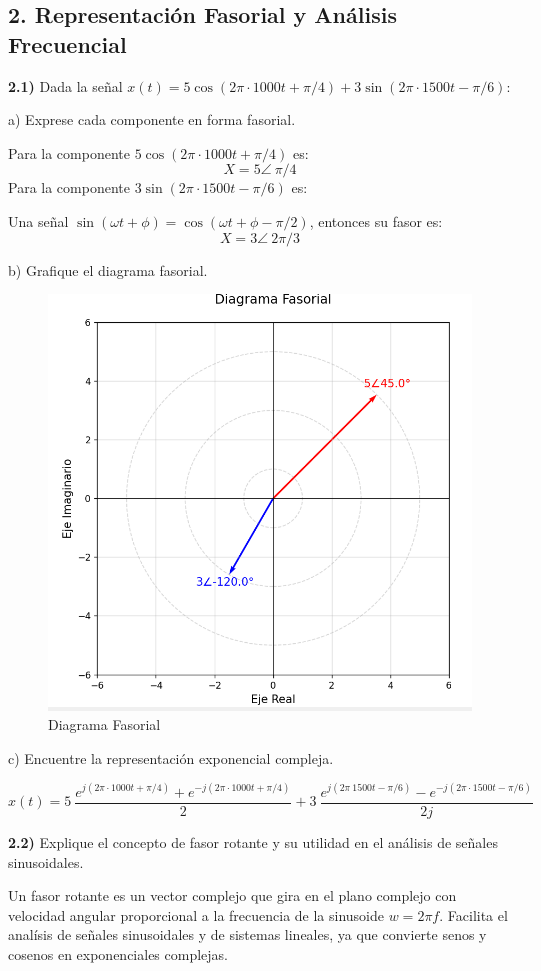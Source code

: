 \subsection*{2. Representación Fasorial y Análisis Frecuencial}

\noindent \textbf{2.1)} Dada la señal \( x(t) = 5\cos(2\pi \cdot 1000t + \pi/4) + 3\sin(2\pi \cdot 1500t - \pi/6) \):\par
\bigskip
    \noindent a) Exprese cada componente en forma fasorial.\par
    \bigskip
    
    Para la componente \(5\cos(2\pi \cdot 1000t + \pi/4) \) es:
    \[
    X = 5 \angle \ \pi/4
    \]
    Para la componente \(3\sin(2\pi \cdot 1500t - \pi/6) \) es:\par
    \bigskip
    
    Una señal \(\sin(\omega t + \phi) = \cos(\omega t + \phi - \pi/2)\), entonces su fasor es:
    \[
    X = 3 \angle\ 2\pi/3
    \]
    
    \noindent b) Grafique el diagrama fasorial.\par
    \bigskip

    \begin{figure}[H]
        \centering
        \includegraphics[width=0.5\linewidth]{diagramafasorial_eje2.png}
         \caption{Diagrama Fasorial}
        \label{fig:placeholder}
    \end{figure}

    
    \noindent c) Encuentre la representación exponencial compleja.\par

    \[
x(t)= 5 \ \frac{e^{j(2\pi \cdot 1000 t + \pi/4)} + e^{-j(2\pi \cdot 1000 t + \pi/4)}}{2} +  3 \ \frac{e^{j(2\pi \ 1500 t - \pi/6)} - e^{-j(2\pi \cdot 1500 t - \pi/6)}}{2j}
\]


\noindent \textbf{2.2)} Explique el concepto de fasor rotante y su utilidad en el análisis de señales sinusoidales.\par 
\bigskip

Un fasor rotante es un vector complejo que gira en el plano complejo con velocidad angular proporcional a la frecuencia de la sinusoide $w = 2 \pi f $. Facilita el analísis de señales sinusoidales y de sistemas lineales, ya que convierte senos y cosenos en exponenciales complejas.
